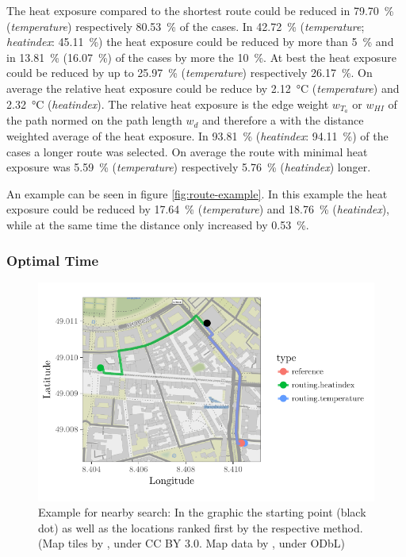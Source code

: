 The heat exposure compared to the shortest route could be reduced in \SI{79.70}{\percent} (\emph{temperature}) respectively  \SI{80.53}{\percent} of the cases. In \SI{42.72}{\percent} (\emph{temperature}; \emph{heatindex}: \SI{45.11}{\percent}) the heat exposure could be reduced by more than \SI{5}{\percent} and in \SI{13.81}{\percent} (\SI{16.07}{\percent}) of the cases by more the \SI{10}{\percent}. At best the heat exposure could be reduced by up to \SI{25.97}{\percent} (\emph{temperature}) respectively  \SI{26.17 }{\percent}. On average the relative heat exposure could be reduce by \SI{2.12}{\celsius} (\emph{temperature}) and \SI{ 2.32}{\celsius} (\emph{heatindex}). The relative heat exposure is the edge weight $w_{T_a}$ or $w_{HI}$ of the path normed on the path length $w_d$ and therefore a with the distance weighted average of the heat exposure. In \SI{93.81}{\percent} (\emph{heatindex}: \SI{94.11}{\percent}) of the cases a longer route was selected. On average the route with minimal heat exposure was \SI{5.59}{\percent} (\emph{temperature}) respectively  \SI{5.76}{\percent} (\emph{heatindex}) longer. 

An example can be seen in figure \ref{fig:route-example}. In this example the heat exposure could be reduced by \SI{17.64}{\percent} (\emph{temperature}) and \SI{18.76}{\percent} (\emph{heatindex}), while at the same time the distance only increased by  \SI{0.53}{\percent}.

\subsubsection{Optimal Time}

\begin{figure}
	\centering
	\includegraphics[scale=0.9]{figures/optimaltime_route_example}
	\caption{Example for nearby search: In the graphic the starting point (black dot) as well as the locations ranked first by the respective method. (Map tiles by \textcite{Stamen2017}, under CC BY 3.0. Map data by \textcite{OSMF2016}, under ODbL)}
	\label{fig:optimaltime-route-example}
\end{figure}

